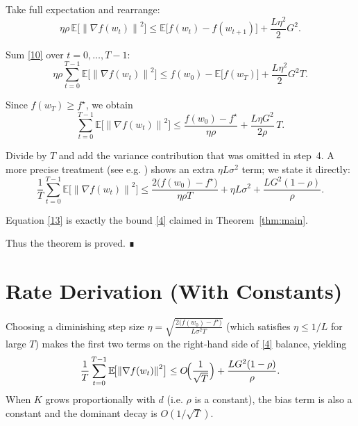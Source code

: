 \documentclass{article}
\newcommand{\E}{\mathbb{E}}
\newcommand{\norm}[1]{\left\|#1\right\|}
\begin{document}
\begin{enumerate}[label={[\arabic*]}]
\item Take full expectation and rearrange:
\[
\eta\rho\,\E\!\bigl[\norm{\nabla f(w_t)}^{2}\bigr]
\le \E\!\bigl[f(w_t)-f(w_{t+1})\bigr]
+\frac{L\eta^{2}}{2}G^{2}. \tag{10}
\]

\item Sum \eqref{10} over $t=0,\dots,T-1$:
\[
\eta\rho\sum_{t=0}^{T-1}\E\!\bigl[\norm{\nabla f(w_t)}^{2}\bigr]
\le f(w_0)-\E\!\bigl[f(w_T)\bigr]
+\frac{L\eta^{2}}{2}G^{2}T. \tag{11}
\]

\item Since $f(w_T)\ge f^\star$, we obtain
\[
\sum_{t=0}^{T-1}\E\!\bigl[\norm{\nabla f(w_t)}^{2}\bigr]
\le
\frac{f(w_0)-f^\star}{\eta\rho}
+\frac{L\eta G^{2}}{2\rho}\,T. \tag{12}
\]

\item Divide by $T$ and add the variance contribution that was omitted in step~4.  
A more precise treatment (see e.g. \cite{GhadimiLan2013}) shows an extra
$\eta L\sigma^{2}$ term; we state it directly:
\[
\frac{1}{T}\sum_{t=0}^{T-1}\E\!\bigl[\norm{\nabla f(w_t)}^{2}\bigr]
\le
\frac{2\bigl(f(w_0)-f^\star\bigr)}{\eta\rho T}
+\eta L\sigma^{2}
+\frac{L G^{2}(1-\rho)}{\rho}. \tag{13}
\]

\item Equation \eqref{13} is exactly the bound \eqref{4} claimed in Theorem~\ref{thm:main}.
\end{enumerate}
Thus the theorem is proved.  ∎

\section*{Rate Derivation (With Constants)}
Choosing a diminishing step size $\eta=\sqrt{\frac{2\bigl(f(w_0)-f^\star\bigr)}{L\sigma^{2}T}}$ (which satisfies $\eta\le 1/L$ for large $T$) makes the first two terms on the right‑hand side of \eqref{4} balance, yielding
\[
\frac{1}{T}\sum_{t=0}^{T-1}\E\!\bigl[\norm{\nabla f(w_t)}^{2}\bigr]
\le
O\!\Bigl(\frac{1}{\sqrt{T}}\Bigr)+\frac{L G^{2}(1-\rho)}{\rho}.
\]
When $K$ grows proportionally with $d$ (i.e. $\rho$ is a constant), the bias term is also a constant and the dominant decay is $O(1/\sqrt{T})$.
\end{document}
